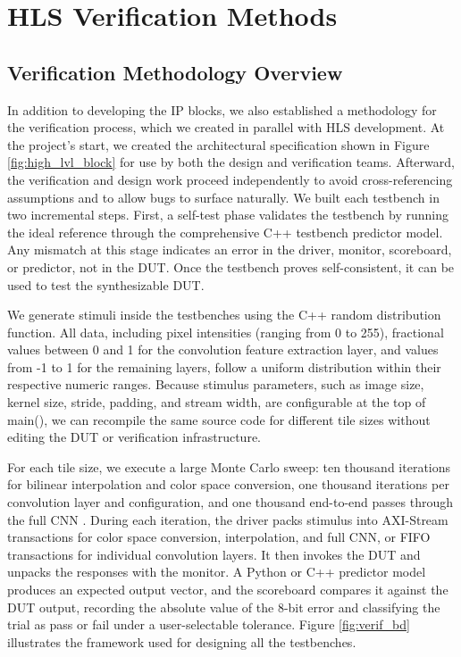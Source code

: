 \documentclass{article}
\begin{document}
\newpage\section{HLS Verification Methods}
    \subsection{Verification Methodology Overview}
    \noindent In addition to developing the IP blocks, we also established a methodology for the verification process, which we created in parallel with HLS development. At the project’s start, we created the architectural specification shown in Figure \ref{fig:high_lvl_block} for use by both the design and verification teams. Afterward, the verification and design work proceed independently to avoid cross-referencing assumptions and to allow bugs to surface naturally. We built each testbench in two incremental steps. First, a self-test phase validates the testbench by running the ideal reference through the comprehensive C++ testbench predictor model. Any mismatch at this stage indicates an error in the driver, monitor, scoreboard, or predictor, not in the DUT. Once the testbench proves self-consistent, it can be used to test the synthesizable DUT.
    \par We generate stimuli inside the testbenches using the C++ random distribution function. All data, including pixel intensities (ranging from 0 to 255), fractional values between 0 and 1 for the convolution feature extraction layer, and values from -1 to 1 for the remaining layers, follow a uniform distribution within their respective numeric ranges. Because stimulus parameters, such as image size, kernel size, stride, padding, and stream width, are configurable at the top of main(), we can recompile the same source code for different tile sizes without editing the DUT or verification infrastructure.
    \par For each tile size, we execute a large Monte Carlo sweep: ten thousand iterations for bilinear interpolation and color space conversion, one thousand iterations per convolution layer and configuration, and one thousand end-to-end passes through the full CNN \cite{aldridge_understanding_2023}. During each iteration, the driver packs stimulus into AXI-Stream transactions for color space conversion, interpolation, and full CNN, or FIFO transactions for individual convolution layers. It then invokes the DUT and unpacks the responses with the monitor. A Python or C++ predictor model produces an expected output vector, and the scoreboard compares it against the DUT output, recording the absolute value of the 8-bit error and classifying the trial as pass or fail under a user-selectable tolerance. Figure \ref{fig:verif_bd} illustrates the framework used for designing all the testbenches.
\end{document}
